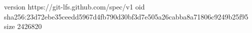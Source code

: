 version https://git-lfs.github.com/spec/v1
oid sha256:23d72ebe35ceedd5967d4fb790d30bf3d7e505a26cabba8a71806c9249b25f95
size 2426820

